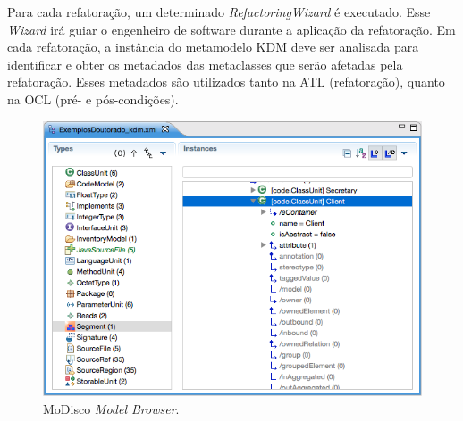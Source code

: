 Para cada refatoração, um determinado \textit{RefactoringWizard} é executado. Esse \textit{Wizard} irá guiar o engenheiro de software durante a aplicação da refatoração. Em cada refatoração, a instância do metamodelo KDM deve ser analisada para identificar e obter os metadados das metaclasses que serão afetadas pela refatoração. Esses metadados são utilizados tanto na ATL (refatoração), quanto na OCL (pré- e pós-condições). 


\begin{figure}[h]
	\centering
	\caption{MoDisco \textit{Model Browser}.}
	\label{fig:modisco_modeol_browser}
	\includegraphics[scale=0.6]{images/kdm-re_modisco}
	\fautor
\end{figure}

